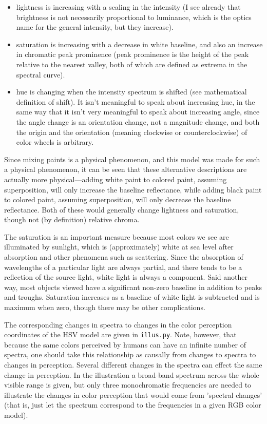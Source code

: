\documentclass{article}
\begin{document}
\begin{itemize}
\item lightness is increasing with a scaling in the intensity (I see already
that brightness is not necessarily proportional to luminance, which is the
optics name for the general intensity, but they increase).
\item saturation is increasing with a decrease in white baseline, and also an
increase in chromatic peak prominence (peak prominence is the height of the
peak relative to the nearest valley, both of which are defined as extrema in
the spectral curve).
\item hue is changing when the intensity spectrum is shifted (see mathematical
definition of shift). It isn't meaningful to speak about increasing hue, in the
same way that it isn't very meaningful to speak about increasing angle, since
the angle change is an orientation change, not a magnitude change, and both the
origin and the orientation (meaning clockwise or counterclockwise) of color
wheels is arbitrary.
\end{itemize}

Since mixing paints is a physical phenomenon, and this model was made for such
a physical phenomenon, it can be seen that these alternative descriptions are
actually more physical---adding white paint to colored paint, assuming
superposition, will only increase the baseline reflectance, while adding black
paint to colored paint, assuming superposition, will only decrease the baseline
reflectance. Both of these would generally change lightness and saturation,
though not (by definition) relative chroma.

The saturation is an important measure because most colors we see are
illuminated by sunlight, which is (approximately) white at sea level after
absorption and other phenomena such as scattering. Since the absorption of
wavelengths of a particular light are always partial, and there tends to be a
reflection of the source light, white light is always a component. Said another
way, most objects viewed have a significant non-zero baseline in addition to
peaks and troughs. Saturation increases as a baseline of white light is
subtracted and is maximum when zero, though there may be other complications.

The corresponding changes in spectra to changes in the color perception
coordinates of the HSV model are given in \texttt{illus.py}. Note, however,
that because the same colors perceived by humans can have an infinite number of
spectra, one should take this relationship as causally from changes to spectra
to changes in perception. Several different changes in the spectra can effect
the same change in perception. In the illustration a broad-band spectrum across
the whole visible range is given, but only three monochromatic frequencies are
needed to illustrate the changes in color perception that would come from
'spectral changes' (that is, just let the spectrum correspond to the
frequencies in a given RGB color model).
\end{document}
